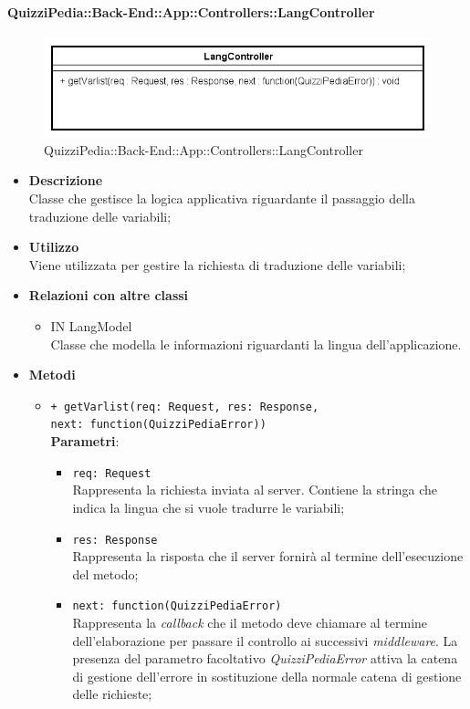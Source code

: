\paragraph{QuizziPedia::Back-End::App::Controllers::LangController}
\label{QuizziPedia::Back-End::App::Controllers::UserController}
\begin{figure}[ht]
	\centering
	\includegraphics[scale=0.45]{UML/Classi/Back-End/QuizziPedia_Back-End_App_Controllers_langController.png}
	\caption{QuizziPedia::Back-End::App::Controllers::LangController}
\end{figure}
\FloatBarrier
\begin{itemize}
	\item 
	\textbf{Descrizione}\\
	Classe che gestisce la logica applicativa riguardante il passaggio della traduzione delle variabili;
	\item \textbf{Utilizzo}\\
	Viene utilizzata per gestire la richiesta di traduzione delle variabili;
	\item \textbf{Relazioni con altre classi}
	\begin{itemize}
		\item IN LangModel \\
		Classe che modella le informazioni riguardanti la lingua dell'applicazione.
	\end{itemize}
	\item \textbf{Metodi}
		\begin{itemize}
			\item \texttt{+ getVarlist(req: Request, res: Response,\\ next: function(QuizziPediaError))} \\
			\textbf{Parametri}:
				\begin{itemize}
					\item \texttt{req: Request} \\
					Rappresenta la richiesta inviata al server. Contiene la stringa che indica la lingua che si vuole tradurre le variabili;
					\item \texttt{res: Response} \\
					Rappresenta la risposta che il server fornirà al termine  dell'esecuzione del metodo;
					\item \texttt{next: function(QuizziPediaError)} \\
					Rappresenta la \textit{callback} che il metodo deve chiamare al termine dell'elaborazione per passare il controllo ai successivi \textit{middleware}. La presenza del parametro facoltativo \textit{QuizziPediaError} attiva la catena di gestione dell'errore in sostituzione della normale catena di gestione delle richieste;
				\end{itemize}
		\end{itemize}
\end{itemize}
